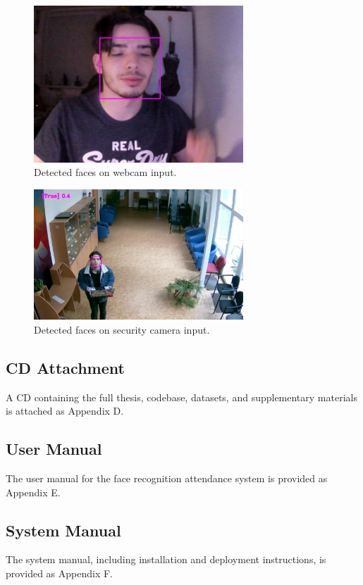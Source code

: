 \begin{figure}[ht!]
    \centering
    \includegraphics[width=0.7\textwidth]{../Files/webcam_result.jpg}
    \caption{Detected faces on webcam input.}
    \label{fig:webcam-result}
\end{figure}

\begin{figure}[ht!]
    \centering
    \includegraphics[width=0.7\textwidth]{../Files/seccam_result.jpg}
    \caption{Detected faces on security camera input.}
    \label{fig:seccam-result}
\end{figure}


\subsection*{CD Attachment}
A CD containing the full thesis, codebase, datasets, and supplementary materials is attached as Appendix D.

\subsection*{User Manual}
The user manual for the face recognition attendance system is provided as Appendix E.

\subsection*{System Manual}
The system manual, including installation and deployment instructions, is provided as Appendix F.

